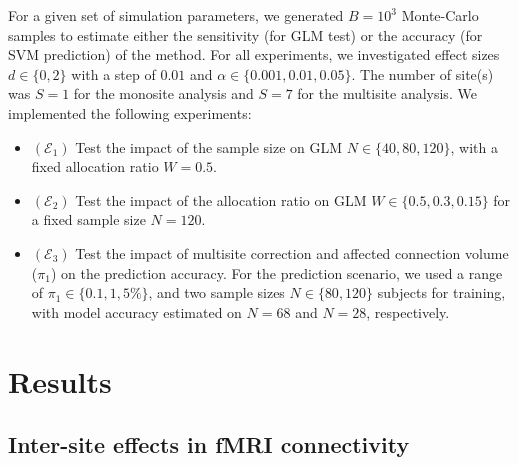 \documentclass[authoryear]{elsarticle}
\begin{document}
For a given set of simulation parameters, we generated $B=10^3$ Monte-Carlo
samples to estimate either the sensitivity (for GLM test) or the accuracy (for
SVM prediction) of the method. For all experiments, we investigated effect sizes
$d\in\{0,2\}$ with a step of $0.01$ and $\alpha\in\{0.001,0.01,0.05\}$. The
number of site(s) was $S=1$ for the monosite analysis and $S=7$ for the
multisite analysis. We implemented the following experiments:

\begin{itemize}
\item $(\mathcal{E}_1)$ Test the impact of the sample size on GLM
$N\in\{40,80,120\}$, with a fixed allocation ratio $W=0.5$.
\item $(\mathcal{E}_2)$ Test the impact of the allocation ratio on GLM
$W\in\{0.5,0.3,0.15\}$ for a fixed sample size $N=120$.
\item $(\mathcal{E}_3)$ Test the impact of multisite correction and affected
connection volume ($\pi_1$) on the prediction accuracy. For the prediction
scenario, we used a range of $\pi_1\in\{0.1,1,5\%\}$, and two sample sizes
$N\in\{80,120\}$ subjects for training, with model accuracy estimated on $N=68$
and $N=28$, respectively.
\end{itemize}


\section{Results}

\subsection{Inter-site effects in fMRI connectivity}
\end{document}
